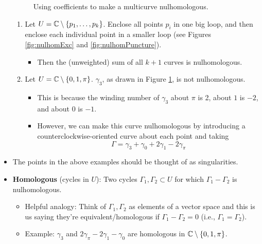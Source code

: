 \documentclass[../notes.tex]{subfiles}
\begin{document}
\begin{itemize}
\begin{figure}[h!]
        \vspace{-2em}
        \caption{Using coefficients to make a multicurve nulhomologous.}
        \label{fig:nulhomCoeff}
    \end{figure}
    \begin{enumerate}
        \item Let $U=\mathbb{C}\setminus\{p_1,\dots,p_k\}$. Enclose all points $p_i$ in one big loop, and then enclose each individual point in a smaller loop (see Figures \ref{fig:nulhomExc} and \ref{fig:nulhomPuncture}).
        \begin{itemize}
            \item Then the (unweighted) sum of all $k+1$ curves is nulhomologous.
        \end{itemize}
        \item Let $U=\mathbb{C}\setminus\{0,1,\pi\}$. $\gamma_3$, as drawn in Figure \ref{fig:nulhomCoeff}, is not nulhomologous.
        \begin{itemize}
            \item This is because the winding number of $\gamma_3$ about $\pi$ is 2, about $1$ is $-2$, and about 0 is $-1$.
            \item However, we can make this curve nulhomologous by introducing a counterclockwise-oriented curve about each point and taking
            \begin{equation*}
                \Gamma = \gamma_3+\gamma_0+2\gamma_1-2\gamma_\pi
            \end{equation*}
        \end{itemize}
    \end{enumerate}
    \item The points in the above examples should be thought of as singularities.
    \item \textbf{Homologous} (cycles in $U$): Two cycles $\Gamma_1,\Gamma_2\subset U$ for which $\Gamma_1-\Gamma_2$ is nulhomologous.
    \begin{itemize}
        \item Helpful analogy: Think of $\Gamma_1,\Gamma_2$ as elements of a vector space and this is us saying they're equivalent/homologous if $\Gamma_1-\Gamma_2=0$ (i.e., $\Gamma_1=\Gamma_2$).
        \item Example: $\gamma_3$ and $2\gamma_\pi-2\gamma_1-\gamma_0$ are homologous in $\mathbb{C}\setminus\{0,1,\pi\}$.

\end{itemize}
\end{itemize}
\end{document}
